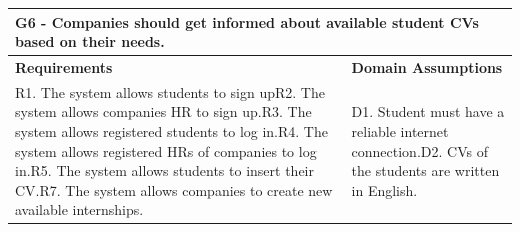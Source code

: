 \documentclass{article}
\begin{document}
\begin{table}[H]
    \centering
    \begin{tabular}{|p{}|p{}|}
        \hline
        \multicolumn{2}{|p{10cm}|}{\textbf{G6} - Companies should get informed about available student CVs based on their needs.} \\
        \hline
        \textbf{Requirements} & \textbf{Domain Assumptions} \\
        \hline
        R1. The system allows students to sign up\newline R2. The system allows companies HR to sign up.\newline R3. The system allows registered students to log in.\newline R4. The system allows registered HRs of companies to log in.\newline R5. The system allows students to insert their CV.\newline R7. The system allows companies to create new available internships.\newline & D1. Student must have a reliable internet connection.\newline D2. CVs of the students are written in English.\newline 
\\

        \hline
    \end{tabular}
\end{table}
\end{document}
